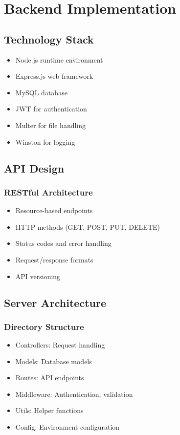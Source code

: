 \chapter{Backend Implementation}

\section{Technology Stack}
\begin{itemize}
    \item Node.js runtime environment
    \item Express.js web framework
    \item MySQL database
    \item JWT for authentication
    \item Multer for file handling
    \item Winston for logging
\end{itemize}

\section{API Design}
\subsection{RESTful Architecture}
\begin{itemize}
    \item Resource-based endpoints
    \item HTTP methods (GET, POST, PUT, DELETE)
    \item Status codes and error handling
    \item Request/response formats
    \item API versioning
\end{itemize}

\section{Server Architecture}
\subsection{Directory Structure}
\begin{itemize}
    \item Controllers: Request handling
    \item Models: Database models
    \item Routes: API endpoints
    \item Middleware: Authentication, validation
    \item Utils: Helper functions
    \item Config: Environment configuration
\end{itemize}

